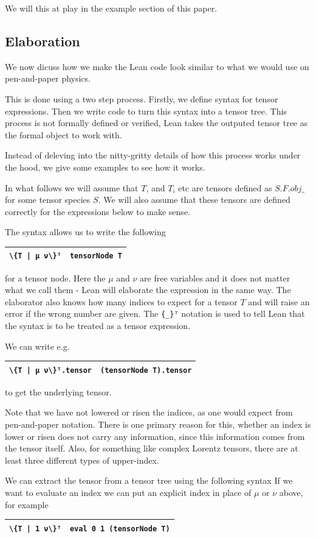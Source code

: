 \documentclass[a4paper, 11pt]{article}
\newcommand{\syntaxElab}[2]{ 
  \arrayrulecolor{mycolor}
  \begin{center}
    \begin{tabular}{|p{1.7in} | p{4in}|}
    \hline
    \hfill {#1} & {#2} \\
    \hline
    \end{tabular}
    \end{center}
  \arrayrulecolor{black}
}
\begin{document}
We will this at play in the example section of this paper.


\subsection{Elaboration}

We now dicuss how we make the Lean code look similar to what we would use on pen-and-paper physics. 

This is done using a two step process. Firstly, we define syntax for tensor expressions. 
Then we write code to turn this syntax into a tensor tree. This process is not formally defined or 
verified, Lean takes the outputed tensor tree as the formal object to work with.

Instead of deleving into the nitty-gritty details of how this process works under the hood, 
we give some examples to see how it works. 

In what follows we will assume that $T$, and $T_i$ etc are tensors defined as $S.F.obj \_$ for 
some tensor species $S$. We will also assume that these tensors are defined correctly for the expressions below 
to make sense.

The syntax allows us to write the following 
\syntaxElab{\lstinline!\{T | μ ν\}ᵀ!}{{\lstinline!tensorNode T!}}
for a tensor node. Here the $\mu$ and $\nu$ are free variables and it does not 
matter what we call them - Lean will elaborate the expression in the same way.
The elaborator also knows how many indices to expect for a tensor $T$ and will raise an error if
the wrong number are given. The \lstinline|{_}ᵀ| notation is used to tell Lean that the syntax
is to be treated as a tensor expression. 

We can write e.g. 
\syntaxElab{\lstinline!\{T | μ ν\}ᵀ.tensor!}{{\lstinline!(tensorNode T).tensor!}}
to get the underlying tensor.

Note that we have not lowered or risen the indices, as one would expect from pen-and-paper notation.
There is one primary reason for this, whether an index is lower or risen does not carry any information, 
since this information comes from the tensor itself. Also, for something like complex Lorentz tensors, 
there are at least three different types of upper-index. 

We can extract the tensor from a tensor tree using the following syntax
If we want to evaluate an index we can put an explicit index in place of $\mu$ or $\nu$ above, 
for example
\syntaxElab{\lstinline!\{T | 1 ν\}ᵀ!}{\lstinline!eval 0 1 (tensorNode T)!}
\end{document}
